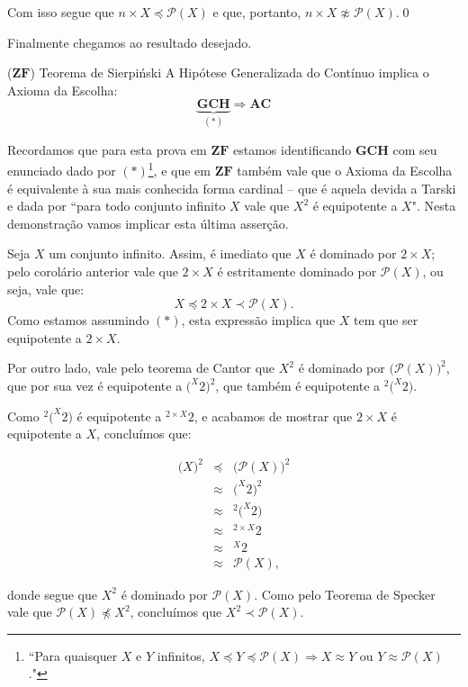 \documentclass{hipatia}
\newcommand{\n}{\noindent}
\newcommand{\dem}{\n{\bf Demonstração: }}
\newcommand{\partes}[1]{\mathcal{P}(#1)}
\newcommand{\preccurlyneq}{\prec}
\newcommand{\gch}{\mathbf{GCH}}
\newcommand{\ac}{\mathbf{AC}}
\newcommand{\zf}{\mathbf{ZF}}
\begin{document}
Com isso segue que $n\times
X\preccurlyeq\partes{X}$ e que, portanto, $n\times
X\not\approx\partes{X}$.\qed

Finalmente chegamos ao resultado desejado.

\begin{teoremacaixa*}{($\zf$) Teorema de
Sierpi\'nski \cite{Sierp}} A Hipótese
Generalizada do Contínuo implica o Axioma da
Escolha:
$$\underbrace{\gch}_{(\ast)}\Longrightarrow\ac$$
\end{teoremacaixa*}

Recordamos que para esta prova em $\zf$ estamos
identificando $\gch$ com seu enunciado dado por
$(\ast)$\footnote{``Para quaisquer $X$ e $Y$
infinitos, $X \preccurlyeq Y
\preccurlyeq\mathcal{P}(X)\Longrightarrow X
\approx Y$ ou $Y \approx \mathcal{P}(X)$."}, e que
em $\zf$ também vale que o Axioma da Escolha é
equivalente à sua mais conhecida forma cardinal
-- que é aquela devida a Tarski e dada por
``para todo conjunto infinito $X$ vale que $X^2$ é
equipotente a $X$". Nesta demonstração vamos
implicar esta última asserção.

\dem Seja $X$ um conjunto infinito. Assim, é
imediato que $X$ é dominado por $2\times X$; pelo
corolário anterior vale que $2\times X$ é
estritamente dominado por $\partes{X}$, ou seja,
vale que: $$X\preccurlyeq 2\times
X\preccurlyneq\partes{X}.$$ Como estamos assumindo
$(\ast)$, esta expressão implica que $X$ tem que
ser equipotente a $2\times X$.

Por outro lado, vale pelo teorema de
Cantor que $X^2$  é dominado por $\big(\partes{X}\big)^2$,
que por sua vez é equipotente a $\big(^X2\big)^2$,
que também é equipotente a $^2\big(^X2\big)$.

Como $^2\big(^X2\big)$ é equipotente a $^{2\times
X}2$, e acabamos de mostrar que $2\times X$ é
equipotente a $X$, concluímos que:

$$\begin{matrix}
\big(X\big)^2&\preccurlyeq&\big(\partes{X}\big)^2
\\&\approx&\big(^X2\big)^2
\\&\approx&^2\big(^X2\big) \\&\approx&^{2\times
X}2 \\&\approx&^X2 \\&\approx&\partes{X},
\end{matrix}$$

donde segue que $X^2$ é dominado por $\partes{X}$.
Como pelo Teorema de Specker vale que
$\partes{X}\npreccurlyeq X^2$, concluímos que
$X^2\preccurlyneq\partes{X}$.
\end{document}
